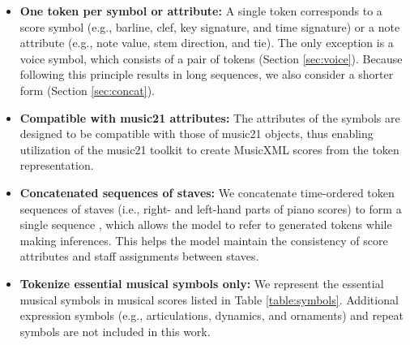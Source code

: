 \documentclass[sigconf]{acmart} %
\begin{document}
\begin{itemize}[leftmargin=1.0em]
\item{\textbf{One token per symbol or attribute:}} A single token corresponds to a score symbol (e.g., barline, clef, key signature, and time signature) or a note attribute (e.g., note value, stem direction, and tie). The only exception is a voice symbol, which consists of a pair of tokens (Section \ref{sec:voice}). Because following this principle results in long sequences, we also consider a shorter form (Section \ref{sec:concat}).
\item{\textbf{Compatible with music21 attributes:}} The attributes of the symbols are designed to be compatible with those of music21 \cite{Cuthbert2010} objects, thus enabling utilization of the music21 toolkit to create MusicXML scores from the token representation.
\item{\textbf{Concatenated sequences of staves:}} We concatenate time-ordered token sequences of staves (i.e., right- and left-hand parts of piano scores) to form a single sequence \cite{Ens2020}, which allows the model to refer to generated tokens while making inferences. This helps the model maintain the consistency of score attributes and staff assignments between staves.
\item{\textbf{Tokenize essential musical symbols only:}} We represent the essential musical symbols in musical scores listed in Table \ref{table:symbols}. Additional expression symbols (e.g., articulations, dynamics, and ornaments) and repeat symbols are not included in this work.
\end{itemize}
\end{document}

